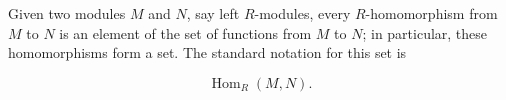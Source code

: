 Given two modules $M$ and $N$, say left $R$-modules, every $R$-homomorphism from $M$ to $N$ is an element of the set of functions from $M$ to $N$; in particular, these homomorphisms form a set. The standard notation for this set is

$$\operatorname{Hom}_R(M, N).$$
